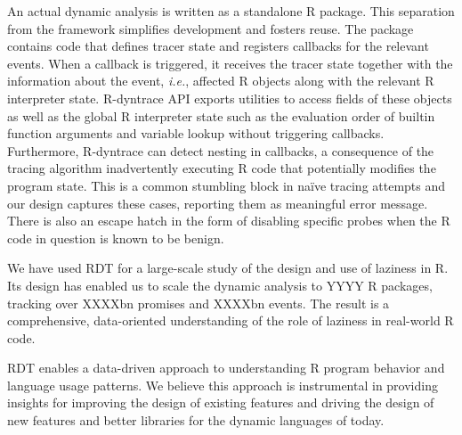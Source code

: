 \documentclass[acmsmall,review]{acmart}
\newcommand{\Ie}{\emph{i.e.}\xspace}
\newcommand{\RDT}{RDT\xspace}
\newcommand{\RDyntrace}{R-dyntrace\xspace}
\begin{document}
\indent An actual dynamic analysis is written as a standalone R package. This
separation from the framework simplifies development and fosters reuse. The
package contains code that defines tracer state and registers callbacks for the
relevant events. When a callback is triggered, it receives the tracer state
together with the information about the event, \Ie, affected R objects along
with the relevant R interpreter state. \RDyntrace API exports utilities to access
fields of these objects as well as the global R interpreter state such as the
evaluation order of builtin function arguments and variable lookup without
triggering callbacks. Furthermore, \RDyntrace can detect nesting in callbacks,
a consequence of the tracing algorithm inadvertently executing R code that
potentially modifies the program state. This is a common stumbling block in
na\"ive tracing attempts and our design captures these cases, reporting them as
meaningful error message. There is also an escape hatch in the form of disabling
specific probes when the R code in question is known to be benign.

We have used \RDT for a large-scale study of the design and use of laziness in
R. Its design has enabled us to scale the dynamic analysis to YYYY R packages,
tracking over XXXXbn promises and XXXXbn events. The result is a comprehensive,
data-oriented understanding of the role of laziness in real-world R code.

\RDT enables a data-driven approach to understanding R program behavior and
language usage patterns. We believe this approach is instrumental in providing
insights for improving the design of existing features and driving the design of
new features and better libraries for the dynamic languages of today.
\end{document}

